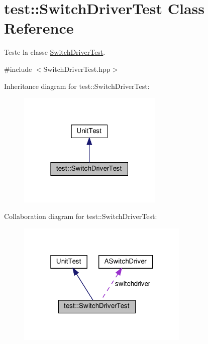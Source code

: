 \hypertarget{classtest_1_1SwitchDriverTest}{}\section{test\+:\+:Switch\+Driver\+Test Class Reference}
\label{classtest_1_1SwitchDriverTest}


Teste la classe \hyperlink{classtest_1_1SwitchDriverTest}{Switch\+Driver\+Test}.  




{\ttfamily \#include $<$Switch\+Driver\+Test.\+hpp$>$}



Inheritance diagram for test\+:\+:Switch\+Driver\+Test\+:
\nopagebreak
\begin{figure}[H]
\begin{center}
\leavevmode
\includegraphics[width=195pt]{classtest_1_1SwitchDriverTest__inherit__graph}
\end{center}
\end{figure}


Collaboration diagram for test\+:\+:Switch\+Driver\+Test\+:
\nopagebreak
\begin{figure}[H]
\begin{center}
\leavevmode
\includegraphics[width=232pt]{classtest_1_1SwitchDriverTest__coll__graph}
\end{center}
\end{figure}
